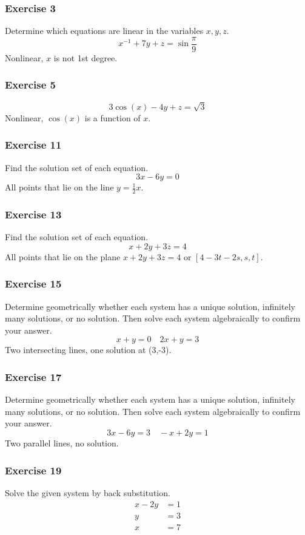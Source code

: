 \documentclass{math}
\begin{document}
\subsubsection*{Exercise 3}
Determine which equations are linear in the variables \( x,y,z \).
\[ x^{-1}+7y+z = \sin\frac{\pi}{9} \]
Nonlinear, \( x \) is not 1st degree.

\subsubsection*{Exercise 5}
\[ 3\cos(x)-4y+z = \sqrt{3} \]
Nonlinear, \( \cos(x) \) is a function of \( x \).

\subsubsection*{Exercise 11}
Find the solution set of each equation.
\[ 3x-6y = 0 \]
All points that lie on the line \( y = \frac{1}{2}x \).

\subsubsection*{Exercise 13}
Find the solution set of each equation.
\[ x+2y+3z = 4 \]
All points that lie on the plane \( x+2y+3z = 4 \) or \( [4-3t-2s,s,t] \).

\subsubsection*{Exercise 15}
Determine geometrically whether each system has a unique solution, infinitely
many solutions, or no solution. Then solve each system algebraically to confirm
your answer.
\[ x+y = 0 \quad 2x+y = 3 \]
Two intersecting lines, one solution at (3,-3).

\subsubsection*{Exercise 17}
Determine geometrically whether each system has a unique solution, infinitely
many solutions, or no solution. Then solve each system algebraically to confirm
your answer.
\[ 3x-6y = 3 \quad -x+2y = 1 \]
Two parallel lines, no solution.

\subsubsection*{Exercise 19}
Solve the given system by back substitution.
\begin{align*}
  x-2y &= 1 \\
  y &= 3 \\
  x &= 7
\end{align*}
\end{document}
